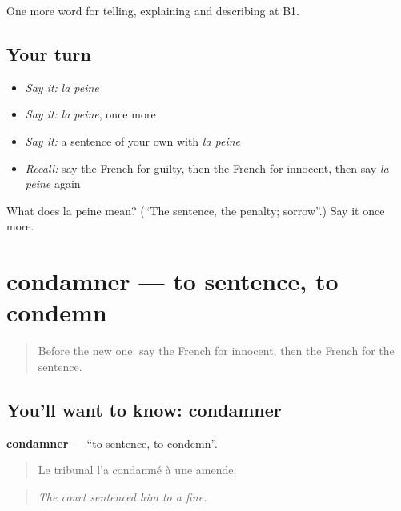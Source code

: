 \begin{grammarlens}[title={What you've built}]
One more word for telling, explaining and describing at B1.
\end{grammarlens}

\subsection*{Your turn}
\begin{itemize}
\raggedright
  \item \emph{Say it:} \emph{la peine}
  \item \emph{Say it:} \emph{la peine}, once more
  \item \emph{Say it:} a sentence of your own with \emph{la peine}
  \item \emph{Recall:} say the French for guilty, then the French for innocent, then say \emph{la peine} again
\end{itemize}

\begin{tcolorbox}[breakable,colback=teal!4,colframe=teal!35!black,title={Before you move on}]
What does la peine mean? (\textquotedblleft{}The sentence, the penalty; sorrow\textquotedblright{}.) Say it once more.
\end{tcolorbox}
\section[condamner]{condamner — to sentence, to condemn}

\label{lesson:FR-C388-condamner}



\begin{quote}
Before the new one: say the French for innocent, then the French for the sentence.
\end{quote}

\subsection*{You'll want to know: condamner}
\textbf{condamner} — \textquotedblleft{}to sentence, to condemn\textquotedblright{}.

\begin{quote}
Le tribunal l'a condamné à une amende.
\end{quote}

\begin{quote}
\emph{The court sentenced him to a fine.}
\end{quote}

